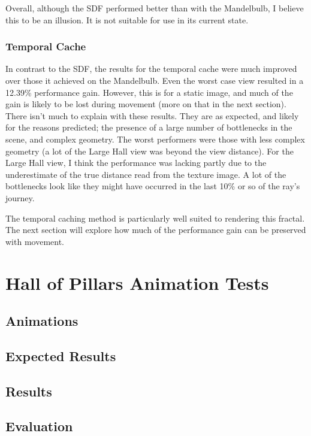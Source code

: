 Overall, although the SDF performed better than with the Mandelbulb, I believe this to be an illusion. It is not suitable for use in its current state.

\subsubsection{Temporal Cache}

In contrast to the SDF, the results for the temporal cache were much improved over those it achieved on the Mandelbulb. Even the worst case view resulted in a 12.39\% performance gain. However, this is for a static image, and much of the gain is likely to be lost during movement (more on that in the next section). There isn't much to explain with these results. They are as expected, and likely for the reasons predicted; the presence of a large number of bottlenecks in the scene, and complex geometry. The worst performers were those with less complex geometry (a lot of the Large Hall view was beyond the view distance). For the Large Hall view, I think the performance was lacking partly due to the underestimate of the true distance read from the texture image. A lot of the bottlenecks look like they might have occurred in the last 10\% or so of the ray's journey.\newline

The temporal caching method is particularly well suited to rendering this fractal. The next section will explore how much of the performance gain can be preserved with movement.

\section{Hall of Pillars Animation Tests}

\subsection{Animations}

\subsection{Expected Results}

\subsection{Results}

\subsection{Evaluation}